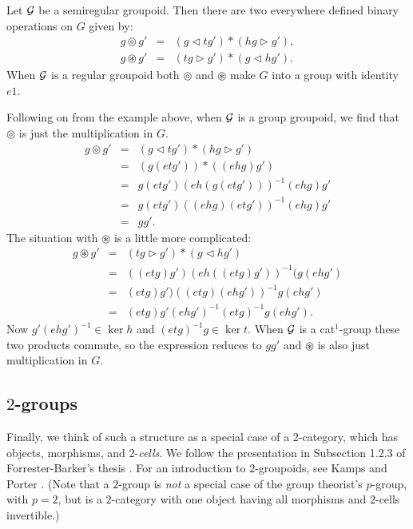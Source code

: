 \begin{prop} 
Let $\mathcal{G}$ be a semiregular groupoid. 
Then there are two everywhere defined binary operations on $G$ given by: 
\begin{eqnarray*}
g \circledcirc g' &=& (g \lhd tg') * (hg \rhd g'), \\ 
g \circledast g' &=& (tg \rhd g') * (g \lhd hg'). 
\end{eqnarray*} 
When $\mathcal{G}$ is a regular groupoid both $\circledcirc$ and $\circledast$ 
make $G$ into a group with identity $e1$. 
\end{prop} 

Following on from the example above, when $\mathcal{G}$ is a group groupoid, 
we find that $\circledcirc$ is just the multiplication in $G$. 
\begin{eqnarray*}
g \circledcirc g' &=& (g \lhd tg') * (hg \rhd g') \\
              &=& (g(etg'))*((ehg)g') \\ 
              &=& g(etg')(eh(g(etg')))^{-1}(ehg)g' \\ 
              &=& g(etg')((ehg)(etg'))^{-1}(ehg)g' \\ 
              &=& gg'. 
\end{eqnarray*} 
\noindent
The situation with $\circledast$ is a little more complicated: 
\begin{eqnarray*}
g \circledast g' &=& (tg \rhd g') * (g \lhd hg') \\ 
                 &=& ((etg)g')(eh((etg)g'))^{-1}(g(ehg') \\ 
                 &=& (etg)g')((etg)(ehg'))^{-1}g(ehg') \\ 
                 &=& (etg)g'(ehg')^{-1}(etg)^{-1}g(ehg'). 
\end{eqnarray*} 
Now $g'(ehg')^{-1} \in \ker h$ and $(etg)^{-1}g \in \ker t$. 
When $\mathcal{G}$ is a cat$^1$-group these two products commute, 
so the expression reduces to $gg'$ and $\circledast$ is also 
just multiplication in $G$.



\subsection{$2$-groups} \label{subs:twogps}

Finally, we think of such a structure as a special case of a 
   
$2$-category, which has objects, morphisms, and $2$-\emph{cells}.
We follow the presentation in Subsection 1.2.3 of 
Forrester-Barker's thesis \cite{f-b-thesis}. 
For an introduction to $2$-groupoids, 
see Kamps and Porter \cite{kamps:port}.
(Note that a $2$-group is \emph{not} a special case of the group theorist's 
$p$-group, with $p=2$, but is a $2$-category with one object having all 
morphisms and $2$-cells invertible.)

